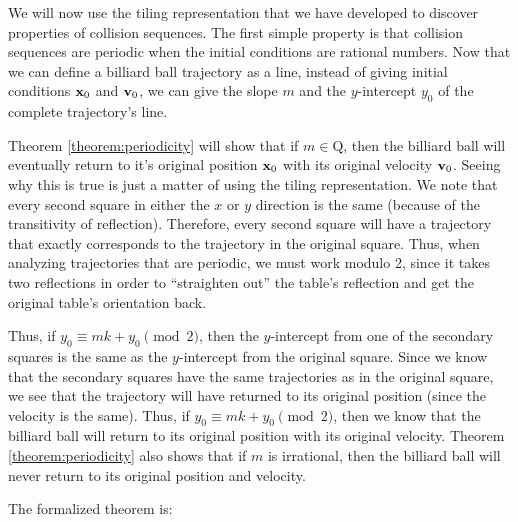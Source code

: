 We will now use the tiling representation that we have developed to discover properties of collision sequences. The first simple property is that collision sequences are periodic when the initial conditions are rational numbers. Now that we can define a billiard ball trajectory as a line, instead of giving initial conditions $\mathbf{x}_0$ and $\mathbf{v}_0$, we can give the slope $m$ and the $y$-intercept $y_0$ of the complete trajectory's line.

Theorem \ref{theorem:periodicity} will show that if $m \in \mathrm{Q}$, then the billiard ball will eventually return to it's original position $\mathbf{x}_0$ with its original velocity $\mathbf{v}_0$. Seeing why this is true is just a matter of using the tiling representation. We note that every second square in either the $x$ or $y$ direction is the same (because of the transitivity of reflection). Therefore, every second square will have a trajectory that exactly corresponds to the trajectory in the original square. Thus, when analyzing trajectories that are periodic, we must work modulo 2, since it takes two reflections in order to ``straighten out'' the table's reflection and get the original table's orientation back.

Thus, if $y_0 \equiv mk + y_0 \pmod{2}$, then the $y$-intercept from one of the secondary squares is the same as the $y$-intercept from the original square. Since we know that the secondary squares have the same trajectories as in the original square, we see that the trajectory will have returned to its original position (since the velocity is the same). Thus, if $y_0 \equiv mk + y_0 \pmod{2}$, then we know that the billiard ball will return to its original position with its original velocity. Theorem \ref{theorem:periodicity} also shows that if $m$ is irrational, then the billiard ball will never return to its original position and velocity.

The formalized theorem is:

